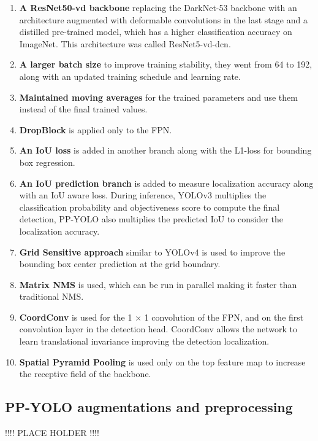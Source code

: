 \documentclass{article}
\begin{document}
\begin{enumerate}
    \item \textbf{A ResNet50-vd backbone} replacing the DarkNet-53 backbone with an architecture augmented with deformable convolutions \cite{dai2017deformable} in the last stage and a distilled pre-trained model, which has a higher classification accuracy on ImageNet. This architecture was called ResNet5-vd-dcn.
    \item \textbf{A larger batch size} to improve training stability, they went from 64 to 192, along with an updated training schedule and learning rate.
    \item \textbf{Maintained moving averages} for the trained parameters and use them instead of the final trained values.
    \item \textbf{DropBlock} is applied only to the FPN.
    \item \textbf{An IoU loss} is added in another branch along with the L1-loss for bounding box regression.
    \item \textbf{An IoU prediction branch} is added to measure localization accuracy along with an IoU aware loss. During inference, YOLOv3 multiplies the classification probability and objectiveness score to compute the final detection, PP-YOLO also multiplies the predicted IoU to consider the localization accuracy.
    \item \textbf{Grid Sensitive approach} similar to YOLOv4 is used to improve the bounding box center prediction at the grid boundary.
    \item \textbf{Matrix NMS} \cite{xinlong2020solov2} is used, which can be run in parallel making it faster than traditional NMS.
    \item \textbf{CoordConv} \cite{liu2018intriguing} is used for the 1 × 1 convolution of the FPN, and on the first convolution layer in the detection head. CoordConv allows the network to learn translational invariance improving the detection localization.
    \item \textbf{Spatial Pyramid Pooling} is used only on the top feature map to increase the receptive field of the backbone.
\end{enumerate}



\subsection{PP-YOLO augmentations and preprocessing}

!!!! PLACE HOLDER !!!!
\end{document}
